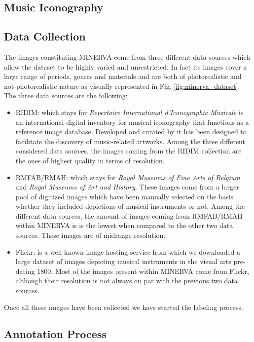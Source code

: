 \subsection{Music Iconography}


\subsection{Data Collection}
The images constituting MINERVA come from three different data sources which allow the dataset to be highly varied and unrestricted. In fact its images cover a large range of periods, genres and materials and are both of photorealistic and not-photorealistic nature as visually represented in Fig. \ref{fig:minerva_dataset}. The three data sources are the following:
\begin{itemize}
	\item RIDIM: which stays for \textit{Repertoire International d'Iconographie Musicale} is an international digital inventory for musical iconography that functions as a reference image database. Developed and curated by \citet{green2013ridim} it has been designed to facilitate the discovery of music-related artworks. Among the three different considered data sources, the images coming from the RIDIM collection are the ones of highest quality in terms of resolution.
	\item RMFAB/RMAH: which stays for \textit{Royal Museums of Fine Arts of Belgium} and \textit{Royal Museums of Art and History}. These images come from a larger pool of digitized images which have been manually selected on the basis whether they included depictions of musical instruments or not. Among the different data sources, the amount of images coming from RMFAB/RMAH within MINERVA is is the lowest when compared to the other two data sources. These images are of midrange resolution.
	\item Flickr: is a well known image hosting service from which we downloaded a large dataset of images depicting musical instruments in the visual arts pre-dating 1800. Most of the images present within MINERVA come from Flickr, although their resolution is not always on par with the previous two data sources.  
\end{itemize}

Once all these images have been collected we have started the labeling process.

\subsection{Annotation Process}

